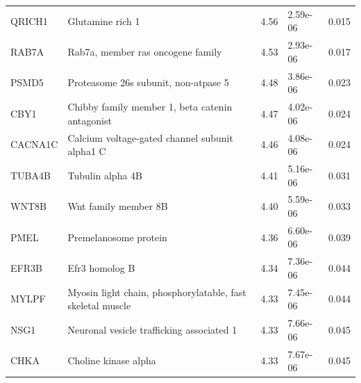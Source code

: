 \documentclass[10pt]{article}
\begin{document}
\begin{table}[]
{\begin{tabular}{p{1.3cm}p{7.2cm}C{0.8cm}C{1.2cm}C{1.5cm}}
QRICH1   & Glutamine rich 1                                           & 4.56          & 2.59e-06      & 0.015          \\
RAB7A    & Rab7a, member ras oncogene family                          & 4.53          & 2.93e-06      & 0.017          \\
PSMD5    & Proteasome 26s subunit, non-atpase 5                       & 4.48          & 3.86e-06      & 0.023          \\
CBY1     & Chibby family member 1, beta catenin antagonist            & 4.47          & 4.02e-06      & 0.024          \\
CACNA1C  & Calcium voltage-gated channel subunit alpha1 C             & 4.46          & 4.08e-06      & 0.024          \\
TUBA4B   & Tubulin alpha 4B                                           & 4.41          & 5.16e-06      & 0.031          \\
WNT8B    & Wnt family member 8B                                       & 4.40          & 5.59e-06      & 0.033          \\
PMEL     & Premelanosome protein                                      & 4.36          & 6.60e-06      & 0.039          \\
EFR3B    & Efr3 homolog B                                             & 4.34          & 7.36e-06      & 0.044          \\
MYLPF    & Myosin light chain, phosphorylatable, fast skeletal muscle & 4.33          & 7.45e-06      & 0.044          \\
NSG1     & Neuronal vesicle trafficking associated 1                  & 4.33          & 7.66e-06      & 0.045          \\
CHKA     & Choline kinase alpha                                       & 4.33          & 7.67e-06      & 0.045          \\

\end{tabular}}
\end{table}
\end{document}
